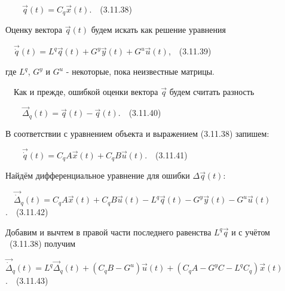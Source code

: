 \documentclass[a4paper]{article}
\begin{document}
{\begin{russian}\sffamily
\ \ \ \  $\vec q(t)=C_q\vec x(t)$.\ \ (3.11.38)
\end{russian}}

{\begin{russian}\sffamily
Оценку вектора  $\vec q(t)$ будем искать как решение уравнения 
\end{russian}}

{\begin{russian}\sffamily
\ \  $\vec{\dot q}(t)=L^q\vec q(t)+G^y\vec y(t)+G^u\vec u(t)$,\ \ (3.11.39)
\end{russian}}

{\begin{russian}\sffamily
где  $L^q$,  $G^y$ и  $G^u$ - некоторые, пока неизвестные матрицы.
\end{russian}}

{\begin{russian}\sffamily
\ \ Как и прежде, ошибкой оценки вектора  $\vec q$ будем считать разность
\end{russian}}

{\begin{russian}\sffamily
\ \ \ \  $\vec Δ_q(t)=\vec q(t)-\vec q(t)$.\ \ (3.11.40)
\end{russian}}

{\begin{russian}\sffamily
В соответствии с уравнением объекта и выражением (3.11.38) запишем:
\end{russian}}

{\begin{russian}\sffamily
\ \ \ \  $\vec{\dot q}(t)=C_qA\vec x(t)+C_qB\vec u(t)$.\ \ (3.11.41)
\end{russian}}

{\begin{russian}\sffamily
Найдём дифференциальное уравнение для ошибки  $Δ\vec q(t)$:
\end{russian}}

{\begin{russian}\sffamily
\ \  $\vec{\dot Δ}_q(t)=C_qA\vec x(t)+C_qB\vec u(t)-L^q\vec q(t)-G^y\vec y(t)-G^u\vec u(t)$.\ \ (3.11.42)
\end{russian}}

{\begin{russian}\sffamily
Добавим и вычтем в правой части последнего равенства  $L^q\vec q$ и с учётом \ (3.11.38) получим
\end{russian}}

{\begin{russian}\sffamily
 $\vec{\dot Δ}_q(t)=L^q\vec Δ_q(t)+(C_qB-G^u)\vec u(t)+(C_qA-G^yC-L^qC_q)\vec x(t)$.\ \ (3.11.43)
\end{russian}}
\end{document}

